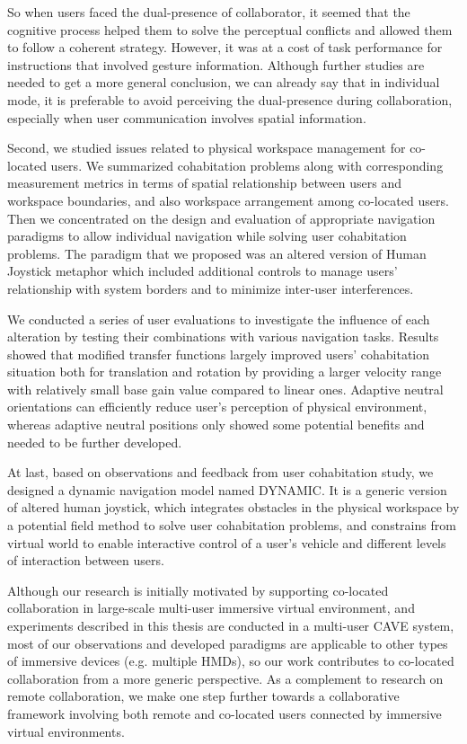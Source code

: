 So when users faced the dual-presence of collaborator, it seemed that the cognitive process helped them to solve the perceptual conflicts and allowed them to follow a coherent strategy. However, it was at a cost of task performance for instructions that involved gesture information. Although further studies are needed to get a more general conclusion, we can already say that in individual mode, it is preferable to avoid perceiving the dual-presence during collaboration, especially when user communication involves spatial information.

Second, we studied issues related to physical workspace management for co-located users. We summarized cohabitation problems along with corresponding measurement metrics in terms of spatial relationship between users and workspace boundaries, and also workspace arrangement among co-located users. Then we concentrated on the design and evaluation of appropriate navigation paradigms to allow individual navigation while solving user cohabitation problems. The paradigm that we proposed was an altered version of Human Joystick metaphor which included additional controls to manage users' relationship with system borders and to minimize inter-user interferences.

We conducted a series of user evaluations to investigate the influence of each alteration by testing their combinations with various navigation tasks. Results showed that modified transfer functions largely improved users' cohabitation situation both for translation and rotation by providing a larger velocity range with relatively small base gain value compared to linear ones. Adaptive neutral orientations can efficiently reduce user's perception of physical environment, whereas adaptive neutral positions only showed some potential benefits and needed to be further developed.

At last, based on observations and feedback from user cohabitation study, we designed a dynamic navigation model named DYNAMIC. It is a generic version of altered human joystick, which integrates obstacles in the physical workspace by a potential field method to solve user cohabitation problems, and constrains from virtual world to enable interactive control of a user's vehicle and different levels of interaction between users.

Although our research is initially motivated by supporting co-located collaboration in large-scale multi-user immersive virtual environment, and experiments described in this thesis are conducted in a multi-user CAVE system, most of our observations and developed paradigms are applicable to other types of immersive devices (e.g. multiple HMDs), so our work contributes to co-located collaboration from a more generic perspective. As a complement to research on remote collaboration, we make one step further towards a collaborative framework involving both remote and co-located users connected by immersive virtual environments.

